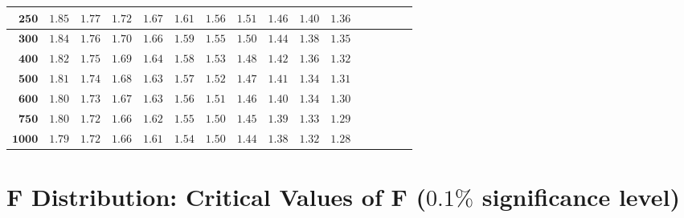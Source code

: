 \begin{longtable}{|r|r|r|r|r|r|r|r|r|r|r|r|r|r|r|r|}
    \(\mathbf{250}\) & \(1.85\) & \(1.77\) & \(1.72\) & \(1.67\) & \(1.61\) & \(1.56\) & \(1.51\) & \(1.46\) & \(1.40\) & \(1.36\) \\  \hline 
    \(\mathbf{300}\) & \(1.84\) & \(1.76\) & \(1.70\) & \(1.66\) & \(1.59\) & \(1.55\) & \(1.50\) & \(1.44\) & \(1.38\) & \(1.35\) \\  \hline 
    \(\mathbf{400}\) & \(1.82\) & \(1.75\) & \(1.69\) & \(1.64\) & \(1.58\) & \(1.53\) & \(1.48\) & \(1.42\) & \(1.36\) & \(1.32\) \\  \hline 
    \(\mathbf{500}\) & \(1.81\) & \(1.74\) & \(1.68\) & \(1.63\) & \(1.57\) & \(1.52\) & \(1.47\) & \(1.41\) & \(1.34\) & \(1.31\) \\  \hline 
    \(\mathbf{600}\) & \(1.80\) & \(1.73\) & \(1.67\) & \(1.63\) & \(1.56\) & \(1.51\) & \(1.46\) & \(1.40\) & \(1.34\) & \(1.30\) \\  \hline 
    \(\mathbf{750}\) & \(1.80\) & \(1.72\) & \(1.66\) & \(1.62\) & \(1.55\) & \(1.50\) & \(1.45\) & \(1.39\) & \(1.33\) & \(1.29\) \\  \hline 
    \(\mathbf{1000}\) & \(1.79\) & \(1.72\) & \(1.66\) & \(1.61\) & \(1.54\) & \(1.50\) & \(1.44\) & \(1.38\) & \(1.32\) & \(1.28\) \\ \hline

\end{longtable}
\changefontsizes{11pt}


\newpage

\section{F Distribution: Critical Values of F ($0.1\%$ significance level)}


\setlength{\LTleft}{-1.5cm} %
\setlength{\LTright}{-1.5cm} %

